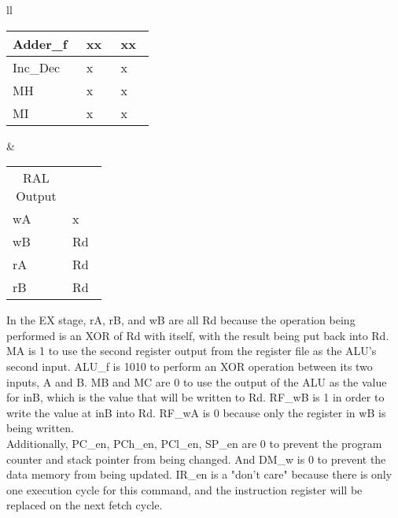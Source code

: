 \documentclass[11pt]{article}
\begin{document}
\begin{enumerate}[leftmargin=0.2in]
\begin{enumerate}
\begin{table}[H]
\begin{tabular}{ll}
\begin{tabular}{|p{0.12\linewidth}|>{\centering\arraybackslash}p{0.12\linewidth}|>{\centering\arraybackslash}p{0.12\linewidth}|}
            Adder\_f  & xx    & xx    \\ \hline
            Inc\_Dec  & x     & x     \\ \hline
            MH        & x     & x     \\ \hline
            MI        & x     & x     \\ \hline
          \end{tabular}
          &
          \begin{tabular}{|p{0.12\linewidth}|>{\centering\arraybackslash}p{0.12\linewidth}|}\hline
            \multicolumn{1}{|c|}{\multirow{2}{0.12\linewidth}{RAL Output}} & \multicolumn{1}{c|}{\texttt{CLR}} \\ \cline{2-2} 
            \multicolumn{1}{|c|}{} & \multicolumn{1}{c|}{EX} \\ \hhline{|=|=|}
            wA & x \\ \hline
            wB & Rd \\ \hline
            rA & Rd \\ \hline
            rB & Rd \\ \hline
          \end{tabular}
        \end{tabular}
        \label{tab:1b}
      \end{table}

      In the EX stage, rA, rB, and wB are all Rd because the operation being performed is an XOR of Rd with itself, with the result being put back into Rd. MA is 1 to use the second register output from the register file as the ALU's second input. ALU\_f is 1010 to perform an XOR operation between its two inputs, A and B. MB and MC are 0 to use the output of the ALU as the value for inB, which is the value that will be written to Rd. RF\_wB is 1 in order to write the value at inB into Rd. RF\_wA is 0 because only the register in wB is being written.\\

      Additionally, PC\_en, PCh\_en, PCl\_en, SP\_en are 0 to prevent the program counter and stack pointer from being changed. And DM\_w is 0 to prevent the data memory from being updated. IR\_en is a "don't care" because there is only one execution cycle for this command, and the instruction register will be replaced on the next fetch cycle.
  \end{enumerate}


\end{enumerate}
\end{document}

